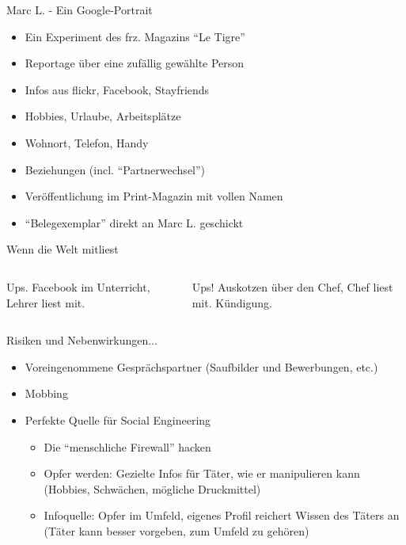 \begin{frame}{Marc L. - Ein Google-Portrait}
	\begin{itemize}
		\item Ein Experiment des frz. Magazins "`Le Tigre"'
		\item<2-> Reportage über eine zufällig gewählte Person
		\item<2-> Infos aus flickr, Facebook, Stayfriends
		\item<3-> Hobbies, Urlaube, Arbeitsplätze
		\item<3-> Wohnort, Telefon, Handy
		\item<3-> Beziehungen (incl. "`Partnerwechsel"')
		\item<4-> Veröffentlichung im Print-Magazin mit vollen Namen
		\item<4-> "`Belegexemplar"' direkt an Marc L. geschickt
	\end{itemize}
\end{frame}

\begin{frame}{Wenn die Welt mitliest}
	\begin{columns}

		Ups. Facebook im Unterricht, Lehrer liest mit.

		Ups! Auskotzen über den Chef, Chef liest mit. Kündigung.
	\end{columns}
\end{frame}

\begin{frame}{Risiken und Nebenwirkungen...}
	\begin{itemize}
		\item Voreingenommene Gesprächspartner (Saufbilder und Bewerbungen, etc.)
		\item Mobbing
		\item Perfekte Quelle für Social Engineering
		\begin{itemize}
			\item<2-> Die "`menschliche Firewall"' hacken
			\item<3-> Opfer werden: Gezielte Infos für Täter, wie er manipulieren kann (Hobbies, Schwächen, mögliche Druckmittel)
			\item<3-> Infoquelle: Opfer im Umfeld, eigenes Profil reichert Wissen des Täters an (Täter kann besser vorgeben, zum Umfeld zu gehören)
		\end{itemize}
	\end{itemize}
\end{frame}

